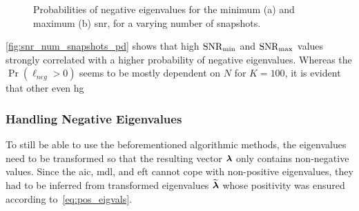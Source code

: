 \begin{figure}[H]
    \centering
    \caption{Probabilities of negative eigenvalues for the minimum (a) and maximum (b) \gls{snr}, for a varying number
    of snapshots.}
    \label{fig:snr_num_snapshots_pd}
\end{figure}

\autoref{fig:snr_num_snapshots_pd} shows that high \( \mathrm{SNR}_{\min} \) and \( \mathrm{SNR}_{\max} \) values strongly correlated with a
higher probability of negative eigenvalues. Whereas the \( \Pr(\ell_{\textit{neg}} > 0) \) seems to be mostly dependent
on \( N \) for \( K = 100 \), it is evident that other even hg


\subsubsection{Handling Negative Eigenvalues}
To still be able to use the beforementioned algorithmic methods, the eigenvalues need to be transformed so that the resulting
vector \( \boldsymbol{\lambda} \) only contains non-negative values.
Since the \gls{aic}, \gls{mdl}, and \gls{eft} cannot cope with non-positive eigenvalues, they had to be inferred from transformed
eigenvalues \( \widetilde{\boldsymbol{\lambda}} \) whose positivity was ensured according to~\autoref{eq:pos_eigvals}.

